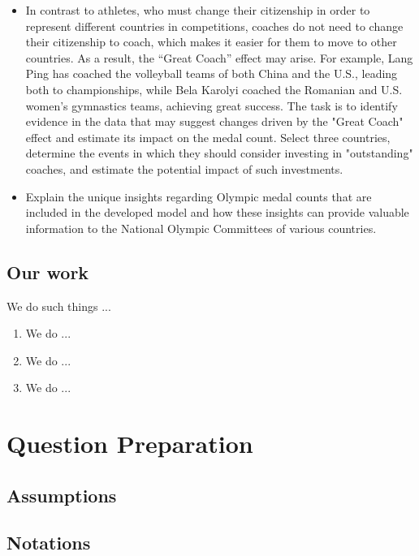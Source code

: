 \documentclass[12pt]{article}  %
\begin{document}
\begin{itemize}
	
	\item In contrast to athletes, who must change their citizenship in order to represent different countries in competitions, coaches do not need to change their citizenship to coach, which makes it easier for them to move to other countries. As a result, the “Great Coach” effect may arise. For example, Lang Ping has coached the volleyball teams of both China and the U.S., leading both to championships, while Bela Karolyi coached the Romanian and U.S. women’s gymnastics teams, achieving great success. The task is to identify evidence in the data that may suggest changes driven by the "Great Coach" effect and estimate its impact on the medal count. Select three countries, determine the events in which they should consider investing in "outstanding" coaches, and estimate the potential impact of such investments.
	\item Explain the unique insights regarding Olympic medal counts that are included in the developed model and how these insights can provide valuable information to the National Olympic Committees of various countries.

\end{itemize}

\subsection{Our work}
We do such things ...




\begin{enumerate}[\bfseries 1.]
    \item We do ...
    \item We do ...
    \item We do ...
\end{enumerate}
\section{Question Preparation}
\subsection{Assumptions}


\subsection{Notations}
\end{document}
